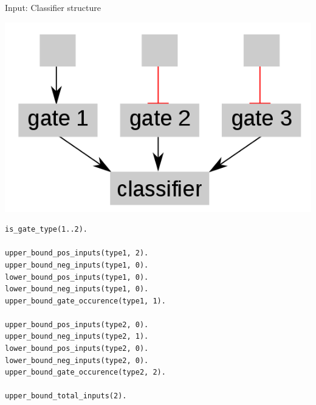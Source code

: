 \documentclass[10pt,dvipsnames]{beamer}
\begin{document}
\begin{frame}[fragile]{Input: Classifier structure}
\begin{center}
\includegraphics[scale=0.2]{classifier.png}
\end{center}
\small
\begin{verbatim}
is_gate_type(1..2).

upper_bound_pos_inputs(type1, 2).
upper_bound_neg_inputs(type1, 0).
lower_bound_pos_inputs(type1, 0).
lower_bound_neg_inputs(type1, 0).
upper_bound_gate_occurence(type1, 1).

upper_bound_pos_inputs(type2, 0).
upper_bound_neg_inputs(type2, 1).
lower_bound_pos_inputs(type2, 0).
lower_bound_neg_inputs(type2, 0).
upper_bound_gate_occurence(type2, 2).

upper_bound_total_inputs(2).
\end{verbatim}
\end{frame}
\end{document}
